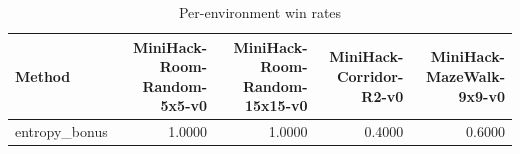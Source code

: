 \begin{table}[htbp]
\centering
\caption{Per-environment win rates}
\label{tab:per-env}
\begin{tabular}{lrrrr}
\toprule
\textbf{Method} & \textbf{MiniHack-Room-Random-5x5-v0} & \textbf{MiniHack-Room-Random-15x15-v0} & \textbf{MiniHack-Corridor-R2-v0} & \textbf{MiniHack-MazeWalk-9x9-v0} \\
\midrule
entropy\_bonus & 1.0000 & 1.0000 & 0.4000 & 0.6000 \\
\bottomrule
\end{tabular}
\end{table}